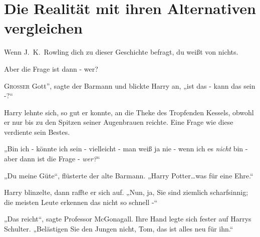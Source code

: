 \chapter{Die Realität mit ihren Alternativen vergleichen}

\begin{chapterOpeningAuthorNote}
Wenn J.~K.~Rowling dich zu dieser Geschichte befragt, du weißt von nichts.
\end{chapterOpeningAuthorNote}
\begin{chapterOpeningQuote}
Aber die Frage ist dann - wer?
\end{chapterOpeningQuote}

\lettrine[ante=„]{G}{roßer} Gott”, sagte der Barmann und blickte Harry an, „ist das - kann das sein -?“

Harry lehnte sich, so gut er konnte, an die Theke des Tropfenden Kessels, obwohl er nur bis zu den Spitzen seiner Augenbrauen reichte. Eine Frage wie diese verdiente sein Bestes.

„Bin ich - könnte ich sein - vielleicht - man weiß ja nie - wenn ich es \emph{nicht} bin - aber dann ist die Frage - \emph{wer?}“

„Du meine Güte“, flüsterte der alte Barmann. „Harry Potter…was für eine Ehre.“

Harry blinzelte, dann raffte er sich auf. „Nun, ja, Sie sind ziemlich scharfsinnig; die meisten Leute erkennen das nicht so schnell -“

„Das reicht“, sagte Professor McGonagall. Ihre Hand legte sich fester auf Harrys Schulter. „Belästigen Sie den Jungen nicht, Tom, das ist alles neu für ihn.“

